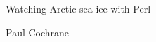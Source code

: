 \documentclass{beamer}
\begin{document}
\begin{frame}
Watching Arctic sea ice with Perl

Paul Cochrane
\end{frame}
\end{document}
